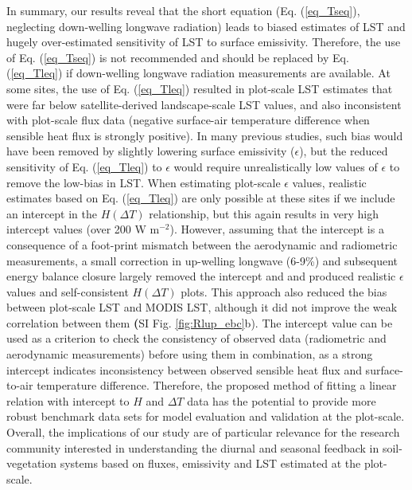 \documentclass[fleqn,10pt]{wlscirep}
\begin{document}
{{In summary, our results reveal that the short equation (Eq. (\ref{eq_Tseq}), neglecting down-welling longwave radiation) leads to biased estimates of LST and hugely over-estimated sensitivity of LST to surface emissivity. Therefore, the use of Eq. (\ref{eq_Tseq}) is not recommended and should be replaced by Eq. (\ref{eq_Tleq}) if down-welling longwave radiation measurements are available. At some sites, the use of Eq. (\ref{eq_Tleq}) resulted in plot-scale LST estimates that were far below satellite-derived landscape-scale LST values, and also inconsistent with plot-scale flux data (negative surface-air temperature difference when sensible heat flux is strongly positive). In many previous studies, such bias would have been removed by slightly lowering surface emissivity ($\epsilon$), but the reduced sensitivity of Eq. (\ref{eq_Tleq}) to $\epsilon$ would require unrealistically low values of $\epsilon$ to remove the low-bias in LST. When estimating plot-scale $\epsilon$ values, realistic estimates based on Eq. (\ref{eq_Tleq}) are only possible at these sites if we include an intercept in the $H (\Delta T)$ relationship, but this again results in very high intercept values (over 200 W m$^{-2}$). However, assuming that the intercept is a consequence of a foot-print mismatch between the aerodynamic and radiometric measurements, a small correction in up-welling longwave (6-9\%) and subsequent energy balance closure largely removed the intercept and and produced realistic $\epsilon$ values and self-consistent $H(\Delta T)$ plots. This approach also reduced the bias between plot-scale LST and MODIS LST, although it did not improve the weak correlation between them \textbf(SI Fig. \ref{fig:Rlup_ebc}b). The intercept value can be used as a criterion to check the consistency of observed data (radiometric and aerodynamic measurements) before using them in combination, as a strong intercept indicates inconsistency between observed sensible heat flux and surface-to-air temperature difference. Therefore, the proposed method of fitting a linear relation with intercept to $H$ and $\Delta T$ data has the potential to provide more robust benchmark data sets for model evaluation and validation at the plot-scale. Overall, the implications of our study are of particular relevance for the research community interested in understanding the diurnal and seasonal feedback in soil-vegetation systems based on fluxes, emissivity and LST estimated at the plot-scale.  


 


}}
\end{document}
